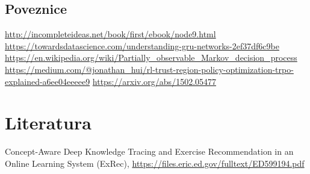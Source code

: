 \documentclass[times, utf8,projekt]{fer}
\begin{document}
\section{Poveznice}
\url{http://incompleteideas.net/book/first/ebook/node9.html}
\url{https://towardsdatascience.com/understanding-gru-networks-2ef37df6c9be}
\url{https://en.wikipedia.org/wiki/Partially_observable_Markov_decision_process}
\url{https://medium.com/@jonathan_hui/rl-trust-region-policy-optimization-trpo-explained-a6ee04eeeee9}
\url{https://arxiv.org/abs/1502.05477}



\chapter{Literatura}
\renewcommand{\bibsection}{}
\begin{thebibliography}{99}
 Concept-Aware Deep Knowledge Tracing and Exercise Recommendation in an Online Learning System (ExRec), \url{https://files.eric.ed.gov/fulltext/ED599194.pdf}



\end{thebibliography}
\end{document}
